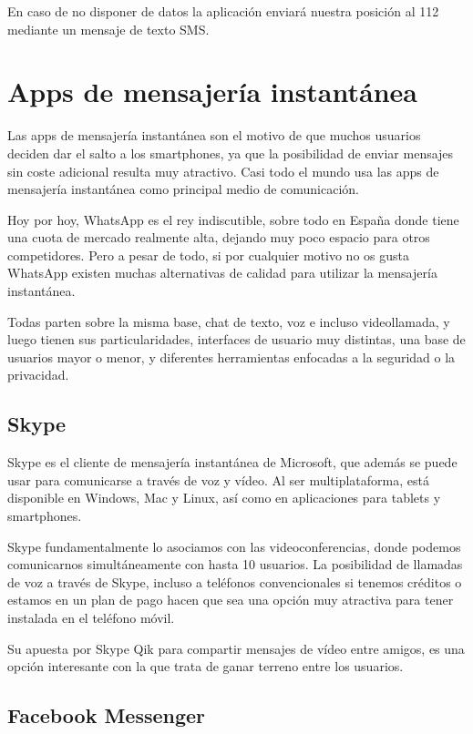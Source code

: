 En caso de no disponer de datos la aplicación enviará nuestra posición al 112 mediante un mensaje de texto SMS.

\section{Apps de mensajería instantánea}

Las apps de mensajería instantánea son el motivo de que muchos usuarios deciden dar el salto a los smartphones, ya que la posibilidad de enviar mensajes sin coste adicional resulta muy atractivo. Casi todo el mundo usa las apps de mensajería instantánea como principal medio de comunicación.

Hoy por hoy, WhatsApp es el rey indiscutible, sobre todo en España donde tiene una cuota de mercado realmente alta, dejando muy poco espacio para otros competidores. Pero a pesar de todo, si por cualquier motivo no os gusta WhatsApp existen muchas alternativas de calidad para utilizar la mensajería instantánea.

Todas parten sobre la misma base, chat de texto, voz e incluso videollamada, y luego tienen sus particularidades, interfaces de usuario muy distintas, una base de usuarios mayor o menor, y diferentes herramientas enfocadas a la seguridad o la privacidad.

\subsection{Skype}

Skype es el cliente de mensajería instantánea de Microsoft, que además se puede usar para comunicarse a través de voz y vídeo. Al ser multiplataforma, está disponible en Windows, Mac y Linux, así como en aplicaciones para tablets y smartphones.

Skype fundamentalmente lo asociamos con las videoconferencias, donde podemos comunicarnos simultáneamente con hasta 10 usuarios.  La posibilidad de llamadas de voz a través de Skype, incluso a teléfonos convencionales si tenemos créditos o estamos en un plan de pago hacen que sea una opción muy atractiva para tener instalada en el teléfono móvil.

Su apuesta por Skype Qik para compartir mensajes de vídeo entre amigos, es una opción interesante con la que trata de ganar terreno entre los usuarios.

\subsection{Facebook Messenger}

